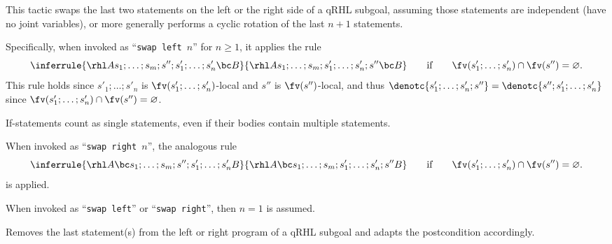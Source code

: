 \documentclass{article}
\begin{document}

This tactic swaps the last two statements on the left or the right side of a qRHL subgoal,
assuming those statements are independent (have no joint variables),
or more generally performs a cyclic rotation of the last $n+1$ statements.

Specifically, when invoked as ``\texttt{swap left $n$}'' for $n\geq1$, it applies the rule
\[
  \inferrule
  {\rhl A{s_1;\dots;s_{m};s'';s'_{1};\dots;s'_{n}}{\bc}{B}}
  {\rhl A{s_1;\dots;s_{m};s'_{1};\dots;s'_{n};s''}{\bc}{B}}
  \qquad
  \text{if}
  \qquad
  \fv(s'_{1};\dots;s'_{n})\cap \fv(s'')=\varnothing.
\]
This rule holds since $s'_{1};\dots;s'_{n}$
is $\fv(s'_{1};\dots;s'_{n})$-local
and $s''$
is $\fv(s'')$-local,
and thus $\denotc{s'_{1};\dots;s'_{n};s''}=\denotc{s'';s'_{1};\dots;s'_{n}}$
since $\fv(s'_{1};\dots;s'_{n})\cap \fv(s'')=\varnothing$.

If-statements count as single statements, even if their bodies contain
multiple statements.

When invoked as ``\texttt{swap right $n$}'', the analogous rule 
\[
  \inferrule
  {\rhl A{\bc}{s_1;\dots;s_{m};s'';s'_{1};\dots;s'_{n}}{B}}
  {\rhl A{\bc}{s_1;\dots;s_{m};s'_{1};\dots;s'_{n};s''}{B}}
  \qquad
  \text{if}
  \qquad
  \fv(s'_{1};\dots;s'_{n})\cap \fv(s'')=\varnothing.
\]
is applied.

When invoked as ``\texttt{swap left}'' or ``\texttt{swap right}'', then $n=1$ is assumed.


Removes the last statement(s) from the left or right program of a qRHL
subgoal and adapts the postcondition accordingly.

\newcommand\WP{\operatorname{wp}}%
\end{document}
